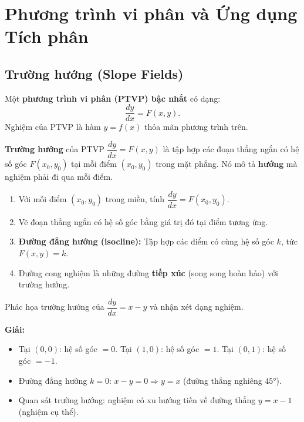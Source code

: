 \documentclass[12pt,a4paper]{article}
\begin{document}
\section{Phương trình vi phân và Ứng dụng Tích phân}

\subsection{Trường hướng (Slope Fields)}

\begin{dinhnghia}[title={Phương trình vi phân bậc nhất}]
  Một \textbf{phương trình vi phân (PTVP) bậc nhất} có dạng:
  \[
    \frac{dy}{dx} = F(x, y).
  \]
  Nghiệm của PTVP là hàm $y = f(x)$ thỏa mãn phương trình trên.
\end{dinhnghia}

\begin{dinhnghia}[title={Trường hướng (Slope Field / Direction Field)}]
  \textbf{Trường hướng} của PTVP $\dfrac{dy}{dx} = F(x, y)$ là tập hợp các đoạn thẳng ngắn có hệ số góc $F(x_0, y_0)$ tại mỗi điểm $(x_0, y_0)$ trong mặt phẳng. Nó mô tả \textbf{hướng} mà nghiệm phải đi qua mỗi điểm.
\end{dinhnghia}

\begin{phuongphap}[title={Đọc và vẽ trường hướng}]
  \begin{enumerate}
    \item Với mỗi điểm $(x_0, y_0)$ trong miền, tính $\dfrac{dy}{dx} = F(x_0, y_0)$.
    \item Vẽ đoạn thẳng ngắn có hệ số góc bằng giá trị đó tại điểm tương ứng.
    \item \textbf{Đường đẳng hướng (isocline):} Tập hợp các điểm có cùng hệ số góc $k$, tức $F(x, y) = k$.
    \item Đường cong nghiệm là những đường \textbf{tiếp xúc} (song song hoàn hảo) với trường hướng.
  \end{enumerate}
\end{phuongphap}

\begin{vidu}
  Phác họa trường hướng của $\dfrac{dy}{dx} = x - y$ và nhận xét dạng nghiệm.

  \medskip\textbf{Giải:}
  \begin{itemize}
    \item Tại $(0,0)$: hệ số góc $= 0$. \quad Tại $(1,0)$: hệ số góc $= 1$. \quad Tại $(0,1)$: hệ số góc $= -1$.
    \item Đường đẳng hướng $k=0$: $x - y = 0 \Rightarrow y = x$ (đường thẳng nghiêng $45°$).
    \item Quan sát trường hướng: nghiệm có xu hướng tiến về đường thẳng $y = x - 1$ (nghiệm cụ thể).
  \end{itemize}
\end{vidu}
\end{document}
